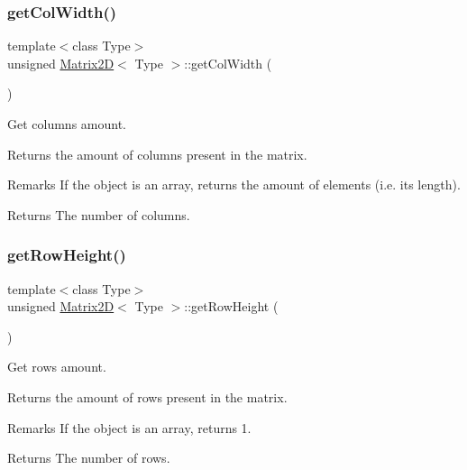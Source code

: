 \subsubsection{\texorpdfstring{get\+Col\+Width()}{getColWidth()}}
{\footnotesize\ttfamily template$<$class Type$>$ \\
unsigned \mbox{\hyperlink{classMatrix2D}{Matrix2D}}$<$ Type $>$\+::get\+Col\+Width (\begin{DoxyParamCaption}{ }\end{DoxyParamCaption})\hspace{0.3cm}{\ttfamily [inline]}}



Get columns amount. 

Returns the amount of columns present in the matrix. \begin{DoxyRemark}{Remarks}
If the object is an array, returns the amount of elements (i.\+e. its length). 
\end{DoxyRemark}
\begin{DoxyReturn}{Returns}
The number of columns. 
\end{DoxyReturn}
\mbox{\label{classMatrix2D_acc55ef0f69af583aaefb8a484b4c2ca7}} 
\subsubsection{\texorpdfstring{get\+Row\+Height()}{getRowHeight()}}
{\footnotesize\ttfamily template$<$class Type$>$ \\
unsigned \mbox{\hyperlink{classMatrix2D}{Matrix2D}}$<$ Type $>$\+::get\+Row\+Height (\begin{DoxyParamCaption}{ }\end{DoxyParamCaption})\hspace{0.3cm}{\ttfamily [inline]}}



Get rows amount. 

Returns the amount of rows present in the matrix. \begin{DoxyRemark}{Remarks}
If the object is an array, returns 1. 
\end{DoxyRemark}
\begin{DoxyReturn}{Returns}
The number of rows. 
\end{DoxyReturn}
\mbox{\label{classMatrix2D_aa9a6df1e7cc653d635baedc659ea00f7}} 
